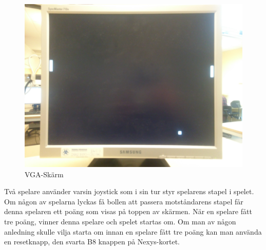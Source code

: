 \begin{center}
	\begin{figure}[H]
    	\centering
		\includegraphics[scale=0.07]{../grafik/rapport-spel.JPG}
		\caption{VGA-Skärm}
		\label{fig:gui}
	\end{figure}
\end{center}

Två spelare använder varsin joystick som i sin tur styr spelarens stapel i spelet. Om någon av spelarna lyckas få bollen att passera motståndarens stapel får denna spelaren ett poäng som visas på toppen av skärmen. När en spelare fått tre poäng, vinner denna spelare och spelet startas om. Om man av någon anledning skulle vilja starta om innan en spelare fått tre poäng kan man använda en resetknapp, den svarta B8 knappen på Nexys-kortet.

